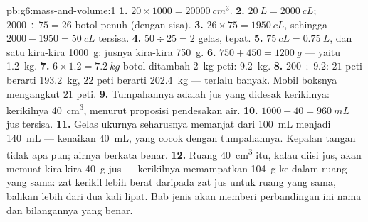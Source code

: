 \begin{solution}{pb:g6:mass-and-volume:1}
\textbf{1.} $20 \times 1000 = \qty{20000}{cm^3}$.
\textbf{2.} $\qty{20}{L} = \qty{2000}{cL}$; $2000 \div 75 = 26$ botol
penuh (dengan sisa).
\textbf{3.} $26 \times 75 = \qty{1950}{cL}$, sehingga $2000 - 1950 =
\qty{50}{cL}$ tersisa.
\textbf{4.} $50 \div 25 = 2$ gelas, tepat.
\textbf{5.} $\qty{75}{cL} = \qty{0.75}{L}$, dan satu  
kira-kira \qty{1000}{g}: jusnya kira-kira \qty{750}{g}.
\textbf{6.} $750 + 450 = \qty{1200}{g}$ --- yaitu \qty{1.2}{kg}.
\textbf{7.} $6 \times 1.2 = \qty{7.2}{kg}$ botol ditambah \qty{2}{kg}
peti: \qty{9.2}{kg}.
\textbf{8.} $200 \div 9.2$: $21$ peti berarti \qty{193.2}{kg}, $22$
peti berarti \qty{202.4}{kg} --- terlalu banyak. Mobil boksnya
mengangkut $21$ peti.
\textbf{9.} Tumpahannya adalah jus yang didesak kerikilnya: 
kerikilnya \qty{40}{cm^3}, menurut proposisi pendesakan air.
\textbf{10.} $1000 - 40 = \qty{960}{mL}$ jus tersisa.
\textbf{11.} Gelas ukurnya seharusnya memanjat dari \qty{100}{mL}
menjadi \qty{140}{mL} --- kenaikan \qty{40}{mL}, yang cocok dengan
tumpahannya. Kepalan tangan tidak  apa pun; airnya berkata
benar.
\textbf{12.} Ruang \qty{40}{cm^3} itu, kalau diisi jus, akan memuat
kira-kira \qty{40}{g} jus --- kerikilnya memampatkan \qty{104}{g} ke
dalam ruang yang sama: zat kerikil lebih berat daripada zat jus untuk
ruang yang sama, bahkan lebih dari dua kali lipat. Bab  jenis
akan memberi perbandingan ini nama dan bilangannya yang benar.
\end{solution}
